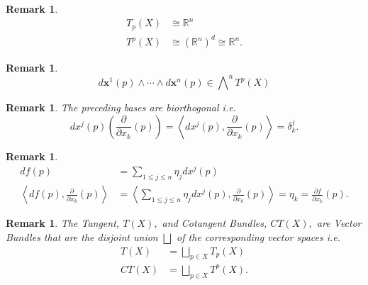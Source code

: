 \documentclass[aps,preprint]{revtex4}%
\newtheorem{remark}[theorem]{Remark}
\begin{document}
\begin{remark}%
\begin{align}
T_{p}\left(  X\right)   &  \cong\mathbb{R}^{n}\\
T^{p}\left(  X\right)   &  \cong\left(  \mathbb{R}^{n}\right)  ^{d}%
\cong\mathbb{R}^{n}.
\end{align}

\end{remark}

\begin{remark}%
\begin{equation}
d\mathbf{x}^{1}\left(  p\right)  \wedge\cdots\wedge d\mathbf{x}^{n}\left(
p\right)  \in%
{\textstyle\bigwedge\nolimits^{n}}
T^{p}\left(  X\right)
\end{equation}

\end{remark}

\begin{remark}
The preceding bases are biorthogonal i.e.
\begin{equation}
dx^{j}\left(  p\right)  \left(  \frac{\partial}{\partial x_{k}}\left(
p\right)  \right)  =\left\langle dx^{j}\left(  p\right)  ,\frac{\partial
}{\partial x_{k}}\left(  p\right)  \right\rangle =\delta_{k}^{j}.
\end{equation}

\end{remark}

\begin{remark}%
\begin{align}
df\left(  p\right)   &  =%
{\textstyle\sum\limits_{1\leq j\leq n}}
\eta_{j}dx^{j}\left(  p\right) \\
\left\langle df\left(  p\right)  ,\frac{\partial}{\partial x_{k}}\left(
p\right)  \right\rangle  &  =\left\langle
{\textstyle\sum\limits_{1\leq j\leq n}}
\eta_{j}dx^{j}\left(  p\right)  ,\frac{\partial}{\partial x_{k}}\left(
p\right)  \right\rangle =\eta_{k}=\frac{\partial f}{\partial x_{k}}\left(
p\right)  .
\end{align}

\end{remark}

\begin{remark}
The Tangent, $T\left(  X\right)  ,$ and Cotangent Bundles, $CT\left(
X\right)  ,$ are Vector Bundles that are the \emph{disjoint union} $\bigsqcup$
of the corresponding vector spaces i.e.
\begin{align}
T\left(  X\right)   &  =\bigsqcup\limits_{p\in X}T_{p}\left(  X\right) \\
CT\left(  X\right)   &  =\bigsqcup\limits_{p\in X}T^{p}\left(  X\right)  .
\end{align}

\end{remark}
\end{document}
